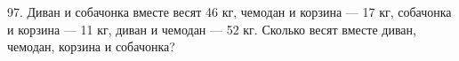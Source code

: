97. Диван и собачонка вместе весят 46 кг, чемодан и корзина --- 17 кг, собачонка и корзина --- 11 кг, диван и чемодан --- 52 кг. Сколько весят вместе диван, чемодан, корзина и собачонка?\\
